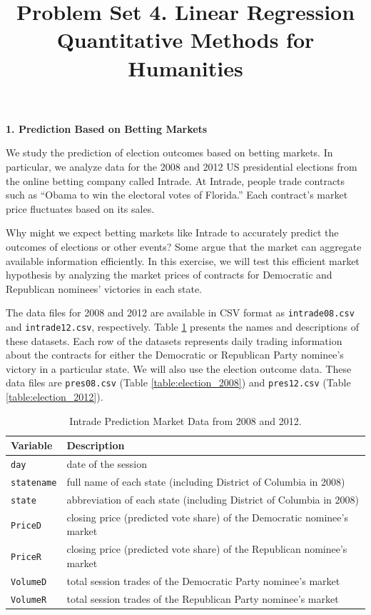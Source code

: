 \documentclass[12pt]{article}
\author{\empty}
\title{Problem Set 4. Linear Regression \\ Quantitative Methods for Humanities}
\date{\empty}
\begin{document}
\maketitle


\begin{center}
    \textbf{\large 1. Prediction Based on Betting Markets}    
\end{center}

We study the prediction of election outcomes based on betting markets. In particular, we analyze data for the 2008 and 2012 US presidential elections from the online betting company called Intrade. At Intrade, people trade contracts such as “Obama to win the electoral votes of Florida.” Each contract’s market price fluctuates based on its sales. 

Why might we expect betting markets like Intrade to accurately predict the outcomes of elections or other events? Some argue that the market can aggregate available information efficiently. In this exercise, we will test this efficient market hypothesis by analyzing the market prices of contracts for Democratic and Republican nominees’ victories in each state.

The data files for 2008 and 2012 are available in CSV format as \texttt{intrade08.csv} and \texttt{intrade12.csv}, respectively. Table \ref{table:intrade} presents the names and descriptions of these datasets. Each row of the datasets represents daily trading information about the contracts for either the Democratic or Republican Party nominee’s victory in a particular state. We will also use the election outcome data. These data files are \texttt{pres08.csv} (Table \ref{table:election_2008}) and \texttt{pres12.csv} (Table \ref{table:election_2012}).

\begin{table}[h!]
\centering
\caption{Intrade Prediction Market Data from 2008 and 2012.}
\label{table:intrade}
\begin{tabular}{ll}
\hline
\textbf{Variable} & \textbf{Description} \\ \hline
\texttt{day} & date of the session \\ 
\texttt{statename} & full name of each state (including District of Columbia in 2008) \\ 
\texttt{state} & abbreviation of each state (including District of Columbia in 2008) \\ 
\texttt{PriceD} & closing price (predicted vote share) of the Democratic nominee’s market \\ 
\texttt{PriceR} & closing price (predicted vote share) of the Republican nominee’s market \\ 
\texttt{VolumeD} & total session trades of the Democratic Party nominee’s market \\ 
\texttt{VolumeR} & total session trades of the Republican Party nominee’s market \\ \hline
\end{tabular}
\end{table}
\end{document}
